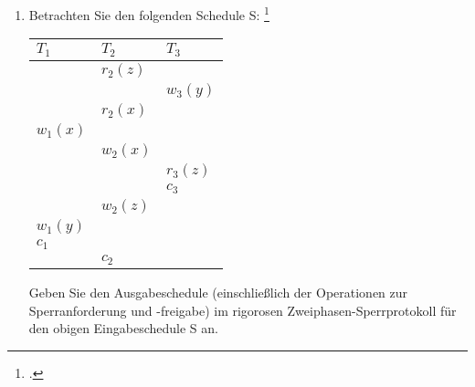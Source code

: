 \documentclass{bschlangaul-aufgabe}
\begin{document}

\def\l#1#2#3{$\text{#1lock}_#2(#3)$}

\begin{enumerate}
\item Betrachten Sie den folgenden Schedule S:
\footcite{examen:66116:2020:03}

\begin{center}
\begin{tabular}{l|l|l}
$T_1$ & $T_2$ & $T_3$ \\\hline
         & $r_2(z)$ & \\
         &          & $w_3(y)$ \\
         & $r_2(x)$ & \\
$w_1(x)$ &          & \\
         & $w_2(x)$ & \\
         &          & $r_3(z)$ \\
         &          & $c_3$ \\
         & $w_2(z)$ & \\
$w_1(y)$ &          & \\
$c_1$    &          & \\
         & $c_2$    & \\
\end{tabular}
\end{center}

Geben Sie den Ausgabeschedule (einschließlich der Operationen zur
Sperranforderung und -freigabe) im rigorosen Zweiphasen-Sperrprotokoll
für den obigen Eingabeschedule S an.


\end{enumerate}
\end{document}
